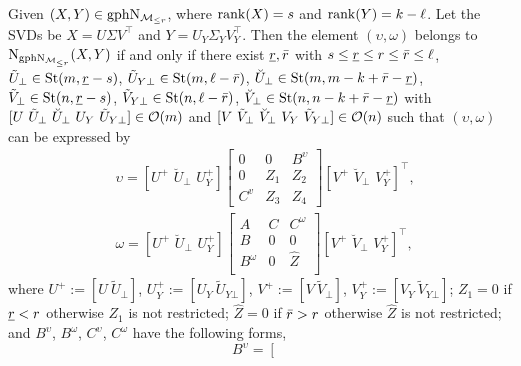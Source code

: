 \begin{theorem}\label{the:Lnormal_graph}
    Given $(X,Y)\in\mathrm{gph}\mathrm{N}_{\mathcal{M}_{\le r}}$, where $\operatorname{rank}(X)=s$ and $\operatorname{rank}(Y)=k-\ell$. Let the SVDs be $X=U\varSigma V^\top$ and $Y=U_Y\varSigma_YV_Y^\top$. Then the element $(\upsilon,\omega)$ belongs to $\mathrm{N}_{\mathrm{gph}\mathrm{N}_{\mathcal{M}_{\le r}}}(X,Y)$ if and only if there exist ${\underline{r}},\bar{r}$ with $s\le{\underline{r}}\le r\le\bar{r}\le\ell$, $\tilde{U}_\bot\in\mathrm{St}(m,{\underline{r}}-s)$, $\tilde{U}_{Y\bot}\in\mathrm{St}(m,\ell-\bar{r})$, $\breve{U}_\bot\in\mathrm{St}(m,m-k+\bar{r}-{\underline{r}})$, $\tilde{V}_\bot\in\mathrm{St}(n,{\underline{r}}-s)$, $\tilde{V}_{Y\bot}\in\mathrm{St}(n,\ell-\bar{r})$, $\breve{V}_\bot\in\mathrm{St}(n,n-k+\bar{r}-{\underline{r}})$ with $[U\ \tilde{U}_\bot\ \breve{U}_\bot\  U_Y\ \tilde{U}_{Y\bot}]\in\orth(m)$ and $[V\ \tilde{V}_\bot\ \breve{V}_\bot\ V_Y\ \tilde{V}_{Y\bot}]\in\orth(n)$ such that $(\upsilon,\omega)$ can be expressed by
    \begin{equation}\label{eq:vw_expression}
        \begin{aligned}
        &\upsilon =\left[ U^+\,\,\breve{U}_\bot\,\,U_{Y}^{+} \right] \left[ 
        \begin{array}{ccc}
            0 & 0 & B^{\upsilon} \\
            0 &  Z_1 & Z_2\\
            C^v & Z_3 & Z_4
        \end{array} 
        \right] \left[ V^+\,\,\breve{V}_\bot\,\,V_{Y}^{+} \right] ^{\top},
        \\
        &\omega = \left[ U^+\,\,\breve{U}_\bot\,\,U_{Y}^{+} \right] \left[ \begin{matrix}
        	A&		C&		C^{\omega}\\
        	B&		0&		0\\
        	B^{\omega}&		0&		\hat{Z}\\
        \end{matrix} \right] \left[ V^+\,\,\breve{V}_\bot\,\,V_{Y}^{+} \right] ^{\top},
        \end{aligned}
    \end{equation}
    where $U^+:=[U\ \tilde{U}_\bot]$, $U^+_{Y}:=[U_{Y}\ \tilde{U}_{Y\bot}]$, $V^+:=[V\ \tilde{V}_{\bot}]$, $V^+_{Y}:=[V_{Y}\ \tilde{V}_{Y\bot}]$; $Z_1=0$ if ${\underline{r}}<r$ otherwise $Z_1$ is not restricted; $\hat{Z}=0$ if $\bar{r}>r$ otherwise $\hat{Z}$ is not restricted; and $B^\upsilon$, $B^\omega$, $C^\upsilon$, $C^\omega$ have the following forms,
    \begin{equation}\label{eq:BBCC}
        B^{\upsilon}=\left[ \begin{matrix}

\end{matrix}
\end{equation}
\end{theorem}
